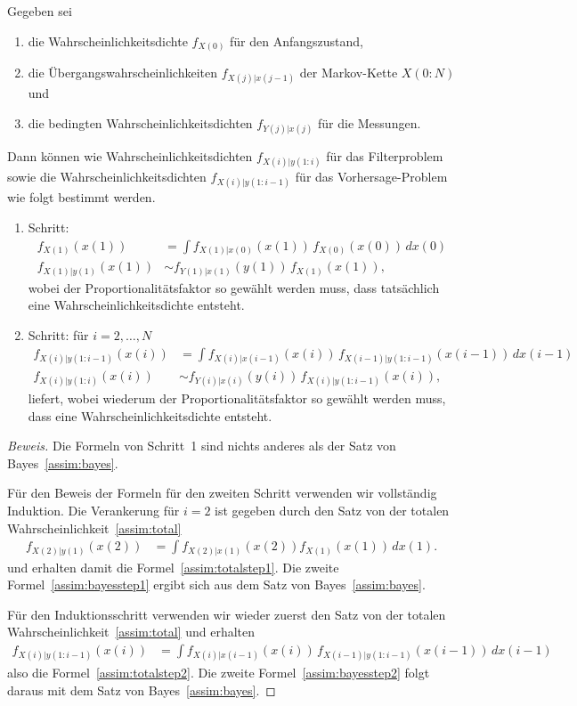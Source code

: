 \begin{satz}
\label{satz:filter und vorhersage}
Gegeben sei
\begin{enumerate}
\item die Wahrscheinlichkeitsdichte $f_{X(0)}$ für den Anfangszustand,
\item die Übergangswahrscheinlichkeiten $f_{X(j)|x(j-1)}$ der
Markov-Kette $X(0:N)$ und
\item die bedingten Wahrscheinlichkeitsdichten $f_{Y(j)|x(j)}$ für die
Messungen.
\end{enumerate}
Dann können wie Wahrscheinlichkeitsdichten $f_{X(i)|y(1:i)}$ für das
Filterproblem sowie die Wahrscheinlichkeitsdichten $f_{X(i)|y(1:i-1)}$
für das Vorhersage-Problem wie folgt bestimmt werden.
\begin{enumerate}
\item Schritt:
\begin{align}
f_{X(1)}(x(1))
&=
\int f_{X(1)|x(0)}(x(1)) \, f_{X(0)}(x(0))\, dx(0)
\label{assim:totalstep1}
\\
f_{X(1)|y(1)}(x(1))
&\sim
f_{Y(1)|x(1)}(y(1))\, f_{X(1)}(x(1)),
\label{assim:bayesstep1}
\end{align}
wobei der Proportionalitätsfaktor so gewählt werden muss, dass tatsächlich
eine Wahrscheinlichkeitsdichte entsteht.
\item Schritt: für $i=2,\dots,N$
\begin{align}
f_{X(i)|y(1:i-1)}(x(i))
&=
\int f_{X(i)|x(i-1)}(x(i))\, f_{X(i-1)|y(1:i-1)}(x(i-1))\,dx(i-1)
\label{assim:totalstep2}
\\
f_{X(i)|y(1:i)}(x(i))
&\sim
f_{Y(i)|x(i)}(y(i))\, f_{X(i)|y(1:i-1)}(x(i)),
\label{assim:bayesstep2}
\end{align}
liefert,
wobei wiederum der Proportionalitätsfaktor so gewählt werden muss, dass
eine Wahrscheinlichkeitsdichte entsteht.
\end{enumerate}
\end{satz}

\begin{proof}[Beweis]
Die Formeln von Schritt~1 sind nichts anderes als der Satz von
Bayes~\eqref{assim:bayes}.

Für den Beweis der Formeln für den zweiten Schritt verwenden wir 
vollständig Induktion.
Die Verankerung für $i=2$ ist gegeben durch den Satz von der totalen
Wahrscheinlichkeit~\eqref{assim:total}
\begin{align*}
f_{X(2)|y(1)}(x(2))
&=
\int f_{X(2)|x(1)}(x(2))  f_{X(1)}(x(1))\, dx(1).
\end{align*}
und erhalten damit die Formel~\eqref{assim:totalstep1}.
Die zweite Formel~\eqref{assim:bayesstep1} ergibt sich aus dem Satz
von Bayes~\eqref{assim:bayes}.

Für den Induktionsschritt verwenden wir wieder zuerst den Satz von der
totalen Wahrscheinlichkeit~\eqref{assim:total} und erhalten
\begin{align*}
f_{X(i)|y(1:i-1)}(x(i))
&=
\int f_{X(i)|x(i-1)}(x(i)) \, f_{X(i-1)|y(1:i-1)}(x(i-1))\,dx(i-1)
\end{align*}
also die Formel~\eqref{assim:totalstep2}.
Die zweite Formel~\eqref{assim:bayesstep2} folgt daraus mit dem Satz
von Bayes~\eqref{assim:bayes}.
\end{proof}


